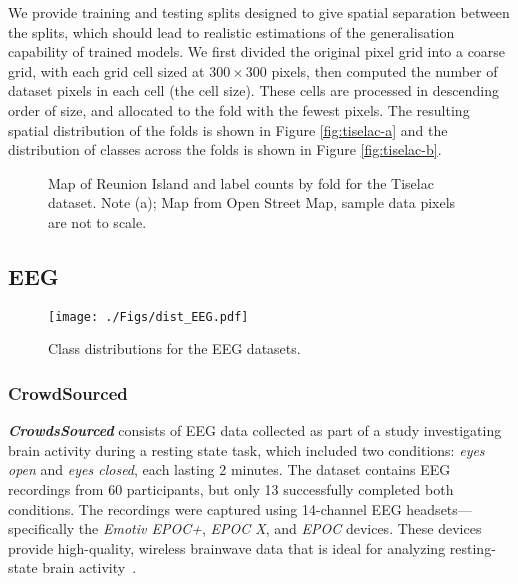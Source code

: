 \documentclass[twoside,11pt,preprint]{article}
\begin{document}
We provide training and testing splits designed to give spatial separation between the splits, which should lead to realistic estimations of the generalisation capability of trained models. We first divided the original pixel grid into a coarse grid, with each grid cell sized at $300 \times 300$ pixels, then computed the number of dataset pixels in each cell (the cell size). These cells are processed in descending order of size, and allocated to the fold with the fewest pixels. The resulting spatial distribution of the folds is shown in Figure \ref{fig:tiselac-a} and the distribution of classes across the folds is shown in Figure \ref{fig:tiselac-b}.

\begin{figure} %
    \centering
    \hfill%
    \caption{Map of Reunion Island and label counts by fold for the Tiselac dataset. Note (a); Map from Open Street Map, sample data pixels are not to scale.}
\end{figure}

\subsection{EEG}

\begin{figure}[h]%
    \centering%
    \texttt{[image: ./Figs/dist\_EEG.pdf]}%
    \caption{Class distributions for the EEG datasets.}%
    \label{fig-class-dist-eeg}
\end{figure}%

\subsubsection{CrowdSourced}

\textbf{\textit{CrowdsSourced}} consists of EEG data collected as part of a study investigating brain activity during a resting state task, which included two conditions: \textit{eyes open} and \textit{eyes closed}, each lasting 2 minutes. The dataset contains EEG recordings from 60 participants, but only 13 successfully completed both conditions. The recordings were captured using 14-channel EEG headsets—specifically the \textit{Emotiv EPOC+}, \textit{EPOC X}, and \textit{EPOC} devices. These devices provide high-quality, wireless brainwave data that is ideal for analyzing resting-state brain activity~\citep{crowdsourced}.
\end{document}
